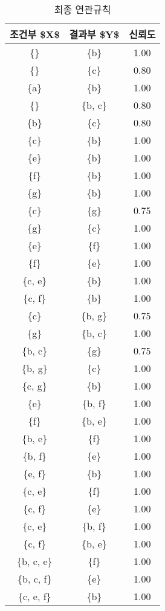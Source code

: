 \documentclass[
]{book}
\begin{document}
\begin{table}

\caption{\label{tab:confident-rules}최종 연관규칙}
\centering
\begin{tabular}[t]{ccc}
\toprule
조건부 \$X\$ & 결과부 \$Y\$ & 신뢰도\\
\midrule
\{\} & \{b\} & 1.00\\
\{\} & \{c\} & 0.80\\
\{a\} & \{b\} & 1.00\\
\{\} & \{b, c\} & 0.80\\
\{b\} & \{c\} & 0.80\\
\addlinespace
\{c\} & \{b\} & 1.00\\
\{e\} & \{b\} & 1.00\\
\{f\} & \{b\} & 1.00\\
\{g\} & \{b\} & 1.00\\
\{c\} & \{g\} & 0.75\\
\addlinespace
\{g\} & \{c\} & 1.00\\
\{e\} & \{f\} & 1.00\\
\{f\} & \{e\} & 1.00\\
\{c, e\} & \{b\} & 1.00\\
\{c, f\} & \{b\} & 1.00\\
\addlinespace
\{c\} & \{b, g\} & 0.75\\
\{g\} & \{b, c\} & 1.00\\
\{b, c\} & \{g\} & 0.75\\
\{b, g\} & \{c\} & 1.00\\
\{c, g\} & \{b\} & 1.00\\
\addlinespace
\{e\} & \{b, f\} & 1.00\\
\{f\} & \{b, e\} & 1.00\\
\{b, e\} & \{f\} & 1.00\\
\{b, f\} & \{e\} & 1.00\\
\{e, f\} & \{b\} & 1.00\\
\addlinespace
\{c, e\} & \{f\} & 1.00\\
\{c, f\} & \{e\} & 1.00\\
\{c, e\} & \{b, f\} & 1.00\\
\{c, f\} & \{b, e\} & 1.00\\
\{b, c, e\} & \{f\} & 1.00\\
\addlinespace
\{b, c, f\} & \{e\} & 1.00\\
\{c, e, f\} & \{b\} & 1.00\\
\bottomrule
\end{tabular}
\end{table}
\end{document}
